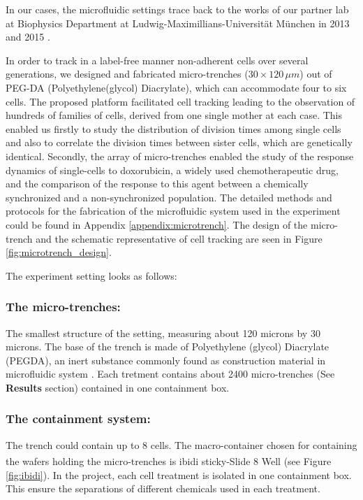 \documentclass[pdftex,12pt,a4paper]{report}
\begin{document}
In our cases, the microfluidic settings trace back to the works of our partner lab at Biophysics Department at Ludwig-Maximillians-Universit\"at M\"unchen in 2013 \cite{marel2013arraying} and 2015 \cite{sekhavati2015marker, sekhavati2015dynamic}.

In order to track in a label-free manner non-adherent cells over several generations, we designed and fabricated micro-trenches ($30 \times 120 \, \mu m$) out of PEG-DA (Polyethylene(glycol) Diacrylate), which can accommodate four to six cells. The proposed platform facilitated cell tracking leading to the observation of hundreds of families of cells, derived from one single mother at each case. This enabled us firstly to study the distribution of division times among single cells and also to correlate the division times between sister cells, which are genetically identical. Secondly, the array of micro-trenches enabled the study of the response dynamics of single-cells to doxorubicin, a widely used chemotherapeutic drug, and the comparison of the response to this agent between a chemically synchronized and a non-synchronized population. The detailed methods and protocols for the fabrication of the microfluidic system used in the experiment could be found in Appendix \ref{appendix:microtrench}. The design of the micro-trench and the schematic representative of cell tracking are seen in Figure \ref{fig:microtrench_design}.

The experiment setting looks as follows:

\subsubsection*{The micro-trenches:}

The smallest structure of the setting, measuring about 120 microns by 30 microns. The base of the trench is made of Polyethylene (glycol) Diacrylate (PEGDA), an inert substance commonly found as construction material in microfluidic system \cite{sekhavati2015marker}. Each tretment contains about 2400 micro-trenches (See \textbf{Results} section) contained in one containment box.

\subsubsection*{The containment system:}

The trench could contain up to 8 cells. The macro-container chosen for containing the wafers holding the micro-trenches is ibidi\textsuperscript{\textregistered} sticky-Slide 8 Well (see Figure \ref{fig:ibidi}). In the project, each cell treatment is isolated in one containment box. This ensure the separations of different chemicals used in each treatment. 
\end{document}
